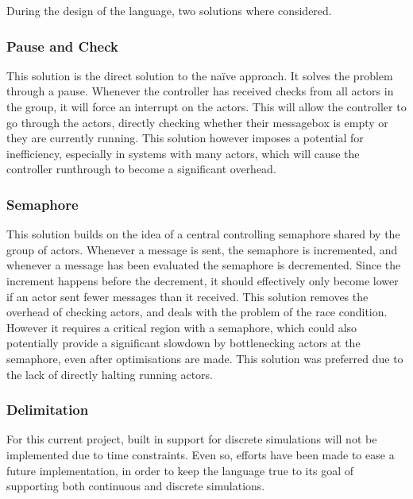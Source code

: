 During the design of the language, two solutions where considered.

\subsubsection{Pause and Check}

This solution is the direct solution to the naïve approach. It solves the problem through a pause. Whenever the controller has received checks from all actors in the group, it will force an interrupt on the actors. This will allow the controller to go through the actors, directly checking whether their messagebox is empty or they are currently running. This solution however imposes a potential for inefficiency, especially in systems with many actors, which will cause the controller runthrough to become a significant overhead.

\subsubsection{Semaphore}

This solution builds on the idea of a central controlling semaphore shared by the group of actors. Whenever a message is sent, the semaphore is incremented, and whenever a message has been evaluated the semaphore is decremented. Since the increment happens before the decrement, it should effectively only become lower if an actor sent fewer messages than it received. This solution removes the overhead of checking actors, and deals with the problem of the race condition. However it requires a critical region with a semaphore, which could also potentially provide a significant slowdown by bottlenecking actors at the semaphore, even after optimisations are made. This solution was preferred due to the lack of directly halting running actors.

\subsubsection{Delimitation}

For this current project, built in support for discrete simulations will not be implemented due to time constraints. Even so, efforts have been made to ease a future implementation, in order to keep the language true to its goal of supporting both continuous and discrete simulations.
